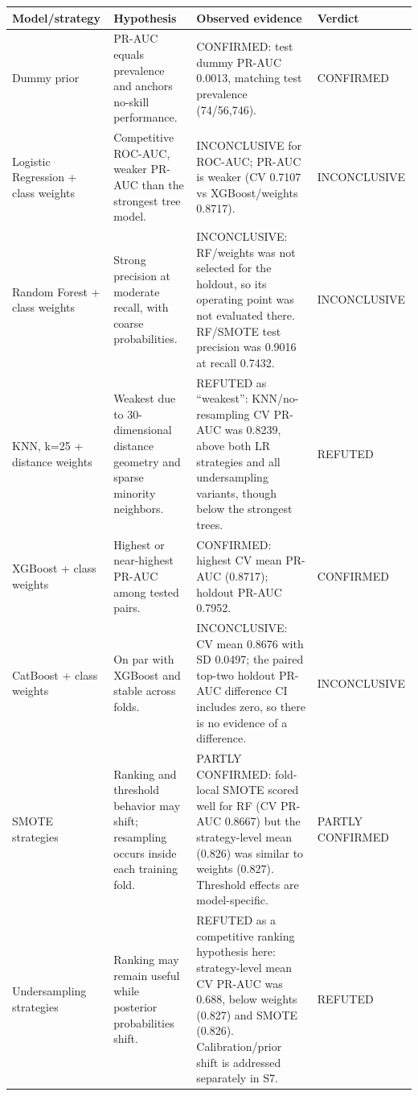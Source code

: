 \begin{tabular}{p{}p{}p{}p{}}
\toprule
Model/strategy & Hypothesis & Observed evidence & Verdict \\
\midrule
Dummy prior & PR-AUC equals prevalence and anchors no-skill performance. & CONFIRMED: test dummy PR-AUC 0.0013, matching test prevalence (74/56,746). & CONFIRMED \\
Logistic Regression + class weights & Competitive ROC-AUC, weaker PR-AUC than the strongest tree model. & INCONCLUSIVE for ROC-AUC; PR-AUC is weaker (CV 0.7107 vs XGBoost/weights 0.8717). & INCONCLUSIVE \\
Random Forest + class weights & Strong precision at moderate recall, with coarse probabilities. & INCONCLUSIVE: RF/weights was not selected for the holdout, so its operating point was not evaluated there. RF/SMOTE test precision was 0.9016 at recall 0.7432. & INCONCLUSIVE \\
KNN, k=25 + distance weights & Weakest due to 30-dimensional distance geometry and sparse minority neighbors. & REFUTED as “weakest”: KNN/no-resampling CV PR-AUC was 0.8239, above both LR strategies and all undersampling variants, though below the strongest trees. & REFUTED \\
XGBoost + class weights & Highest or near-highest PR-AUC among tested pairs. & CONFIRMED: highest CV mean PR-AUC (0.8717); holdout PR-AUC 0.7952. & CONFIRMED \\
CatBoost + class weights & On par with XGBoost and stable across folds. & INCONCLUSIVE: CV mean 0.8676 with SD 0.0497; the paired top-two holdout PR-AUC difference CI includes zero, so there is no evidence of a difference. & INCONCLUSIVE \\
SMOTE strategies & Ranking and threshold behavior may shift; resampling occurs inside each training fold. & PARTLY CONFIRMED: fold-local SMOTE scored well for RF (CV PR-AUC 0.8667) but the strategy-level mean (0.826) was similar to weights (0.827). Threshold effects are model-specific. & PARTLY CONFIRMED \\
Undersampling strategies & Ranking may remain useful while posterior probabilities shift. & REFUTED as a competitive ranking hypothesis here: strategy-level mean CV PR-AUC was 0.688, below weights (0.827) and SMOTE (0.826). Calibration/prior shift is addressed separately in S7. & REFUTED \\
\bottomrule
\end{tabular}
